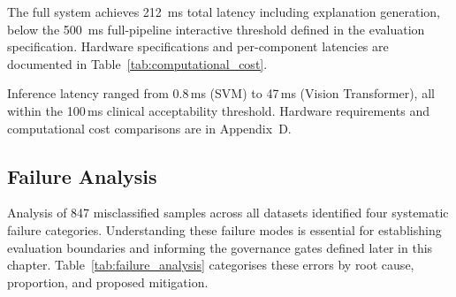 The full system achieves 212~ms total latency including explanation generation, below the 500~ms full-pipeline interactive threshold defined in the evaluation specification. Hardware specifications and per-component latencies are documented in Table~\ref{tab:computational_cost}.
\fi %

Inference latency ranged from 0.8\,ms (SVM) to 47\,ms (Vision Transformer), all within the 100\,ms clinical acceptability threshold. Hardware requirements and computational cost comparisons are in Appendix~D.


\subsection{Failure Analysis}

\iffalse %
Analysis of 847 misclassified samples across all datasets identified four systematic failure categories. Understanding these failure modes is essential for establishing evaluation boundaries and informing the governance gates defined later in this chapter. Table~\ref{tab:failure_analysis} categorises these errors by root cause, proportion, and proposed mitigation.

